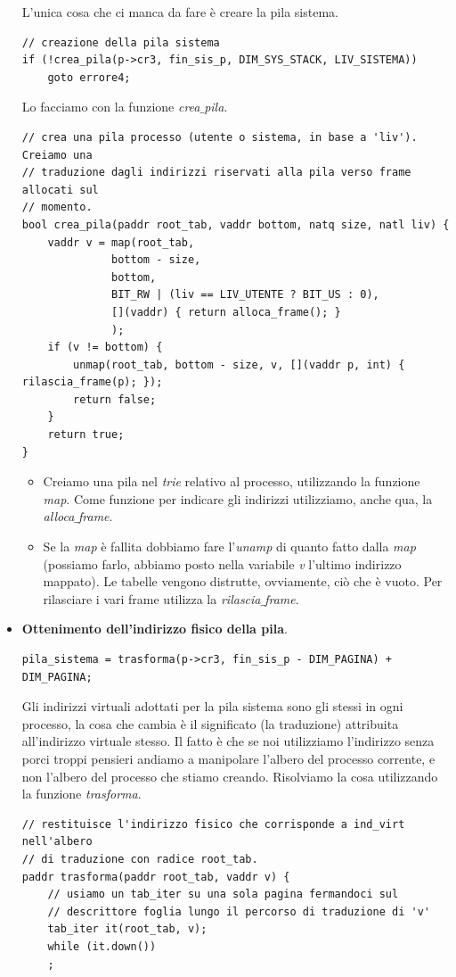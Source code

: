 \documentclass[11pt]{report}
\theoremstyle{definition}
\begin{document}
\begin{itemize}
L'unica cosa che ci manca da fare è creare la pila sistema.
\small 
\begin{verbatim}
// creazione della pila sistema
if (!crea_pila(p->cr3, fin_sis_p, DIM_SYS_STACK, LIV_SISTEMA))
    goto errore4;
\end{verbatim}
\normalsize 
Lo facciamo con la funzione  \emph{crea$\_$pila}.
\small
\begin{verbatim}
// crea una pila processo (utente o sistema, in base a 'liv').  Creiamo una
// traduzione dagli indirizzi riservati alla pila verso frame allocati sul
// momento.
bool crea_pila(paddr root_tab, vaddr bottom, natq size, natl liv) {
    vaddr v = map(root_tab,
              bottom - size,
              bottom,
              BIT_RW | (liv == LIV_UTENTE ? BIT_US : 0),
              [](vaddr) { return alloca_frame(); }
              );
    if (v != bottom) {
        unmap(root_tab, bottom - size, v, [](vaddr p, int) { rilascia_frame(p); });
        return false;
    }
    return true;
}
\end{verbatim}
\normalsize 
\begin{itemize}
	\item Creiamo una pila nel \emph{trie} relativo al processo, utilizzando la funzione \emph{map}. Come funzione per indicare gli indirizzi utilizziamo, anche qua, la \emph{alloca$\_$frame}.
	\item Se la \emph{map} è fallita dobbiamo fare l'\emph{unamp} di quanto fatto dalla \emph{map} (possiamo farlo, abbiamo posto nella variabile \emph{v} l'ultimo indirizzo mappato). Le tabelle vengono distrutte, ovviamente, ciò che è vuoto. Per rilasciare i vari frame utilizza la \emph{rilascia$\_$frame}.
\end{itemize}

\item \textbf{Ottenimento dell'indirizzo fisico della pila}.
\small 
\begin{verbatim}
pila_sistema = trasforma(p->cr3, fin_sis_p - DIM_PAGINA) + DIM_PAGINA;
\end{verbatim}
\normalsize 
Gli indirizzi virtuali adottati per la pila sistema sono gli stessi in ogni processo, la cosa che cambia è il significato (la traduzione) attribuita all'indirizzo virtuale stesso. Il fatto è che se noi utilizziamo l'indirizzo senza porci troppi pensieri andiamo a manipolare l'albero del processo corrente, e non l'albero del processo che stiamo creando. Risolviamo la cosa utilizzando la funzione \emph{trasforma}.
\small
\begin{verbatim}
// restituisce l'indirizzo fisico che corrisponde a ind_virt nell'albero
// di traduzione con radice root_tab.
paddr trasforma(paddr root_tab, vaddr v) {
    // usiamo un tab_iter su una sola pagina fermandoci sul
    // descrittore foglia lungo il percorso di traduzione di 'v'
    tab_iter it(root_tab, v);
    while (it.down())
    ;
	

\end{verbatim}
\end{itemize}
\end{document}
